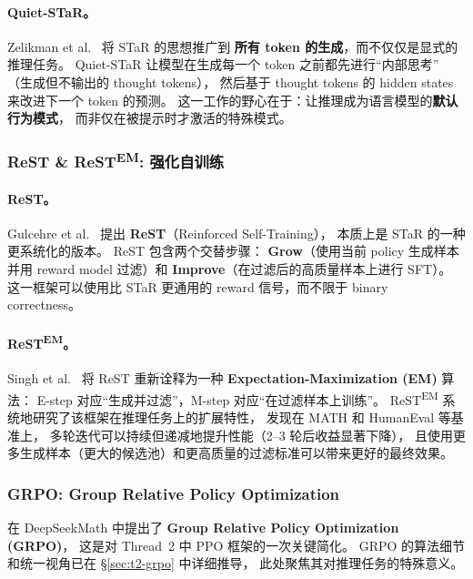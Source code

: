 \paragraph{Quiet-STaR。}
Zelikman et al.\ \cite{zelikman2024quietstar} 将 STaR 的思想推广到
\textbf{所有 token 的生成}，而不仅仅是显式的推理任务。
Quiet-STaR 让模型在生成每一个 token 之前都先进行``内部思考''
（生成但不输出的 thought tokens），
然后基于 thought tokens 的 hidden states 来改进下一个 token 的预测。
这一工作的野心在于：让推理成为语言模型的\textbf{默认行为模式}，
而非仅在被提示时才激活的特殊模式。

\subsubsection{\texorpdfstring{ReST \& ReST\textsuperscript{EM}: 强化自训练}{ReST \& ReST-EM: 强化自训练}}

\paragraph{ReST。}
Gulcehre et al.\ \cite{gulcehre2023rest} 提出 \textbf{ReST}（Reinforced Self-Training），
本质上是 STaR 的一种更系统化的版本。
ReST 包含两个交替步骤：
\textbf{Grow}（使用当前 policy 生成样本并用 reward model 过滤）和
\textbf{Improve}（在过滤后的高质量样本上进行 SFT）。
这一框架可以使用比 STaR 更通用的 reward 信号，而不限于 binary correctness。

\paragraph{ReST\textsuperscript{EM}。}
Singh et al.\ \cite{singh2024restem} 将 ReST 重新诠释为一种
\textbf{Expectation-Maximization (EM)} 算法：
E-step 对应``生成并过滤''，M-step 对应``在过滤样本上训练''。
ReST\textsuperscript{EM} 系统地研究了该框架在推理任务上的扩展特性，
发现在 MATH 和 HumanEval 等基准上，
多轮迭代可以持续但递减地提升性能（2--3 轮后收益显著下降），
且使用更多生成样本（更大的候选池）和更高质量的过滤标准可以带来更好的最终效果。

\subsubsection{GRPO: Group Relative Policy Optimization}
\label{sec:t4-grpo}

 在 DeepSeekMath 中提出了
\textbf{Group Relative Policy Optimization (GRPO)}，
这是对 Thread~2 中 PPO 框架的一次关键简化。
GRPO 的算法细节和统一视角已在 \S\ref{sec:t2-grpo} 中详细推导，
此处聚焦其对推理任务的特殊意义。

